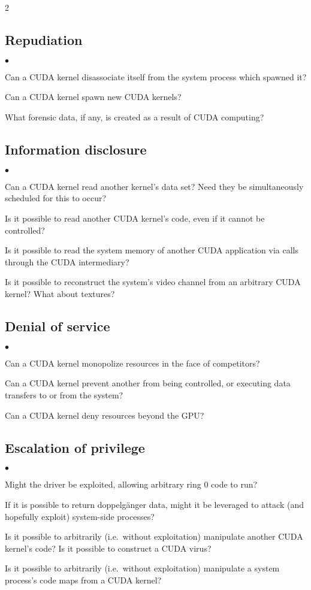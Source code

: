 \documentclass[letterpaper,10pt]{article}
\newcommand{\squishlist}{\begin{list}{$\bullet$}
  {\setlength{\itemsep}{0pt}
    \setlength{\parsep}{3pt}
    \setlength{\topsep}{3pt}
    \setlength{\partopsep}{0pt}
    \setlength{\leftmargin}{1.5em}
    \setlength{\labelwidth}{1em}
    \setlength{\labelsep}{0.5em}
  } }
\newcommand{\squishend}{\end{list}}
\begin{document}
\begin{multicols}{2}


\subsection{Repudiation}
\squishlist
\item Can a CUDA kernel disassociate itself from the system process which spawned it?
\item Can a CUDA kernel spawn new CUDA kernels?
\item What forensic data, if any, is created as a result of CUDA computing?
\squishend
\subsection{Information disclosure}
\squishlist
\item Can a CUDA kernel read another kernel's data set? Need they be simultaneously
scheduled for this to occur?
\item Is it possible to read another CUDA kernel's code, even if it cannot be
controlled?
\item Is it possible to read the system memory of another CUDA application via
calls through the CUDA intermediary?
\item Is it possible to reconstruct the system's video channel from an arbitrary
CUDA kernel? What about textures?
\squishend
\subsection{Denial of service}
\squishlist
\item Can a CUDA kernel monopolize resources in the face of competitors?
\item Can a CUDA kernel prevent another from being controlled, or executing
data transfers to or from the system?
\item Can a CUDA kernel deny resources beyond the GPU\@?
\squishend
\subsection{Escalation of privilege}
\squishlist
\item Might the driver be exploited, allowing arbitrary ring 0 code to run?
\item If it is possible to return doppelg\"anger data, might it be leveraged
to attack (and hopefully exploit) system-side processes?
\item Is it possible to arbitrarily (i.e.\ without exploitation) manipulate
another CUDA kernel's code? Is it possible to construct a CUDA virus?
\item Is it possible to arbitrarily (i.e.\ without exploitation) manipulate a
system process's code maps from a CUDA kernel?
\squishend


\end{multicols}
\end{document}
